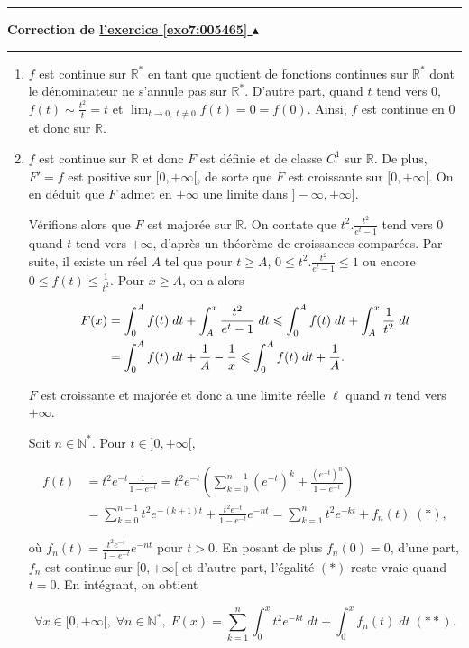 \documentclass[11pt,a4paper]{article}
\newcommand{\Nn}{\mathbb{N}} \newcommand{\N}{\mathbb{N}}
\newcommand{\Rr}{\mathbb{R}} \newcommand{\R}{\mathbb{R}}
\newcounter{exo}
\newcommand{\correction}[1]{\hypertarget{cor7:#1}{}\label{cor7:#1}{\bf Correction de \hyperlink{exo7:#1}{l'exercice \ref{exo7:#1} $\blacktriangle$}}\vspace{1mm}\hrule\vspace{1mm}}
\newcommand{\fincorrection}{\vspace{1mm}\hrule\vspace*{7mm}}
\begin{document}
\fincorrection
\correction{005465}
\begin{enumerate}
\item  $f$ est continue sur $\Rr^*$ en tant que quotient de fonctions continues sur $\Rr^*$ dont le dénominateur ne s'annule pas sur $\Rr^*$. D'autre part, quand $t$ tend vers $0$, $f(t)\sim\frac{t^2}{t}=t$ et $\lim_{t\rightarrow 0,\;t\neq0}f(t)=0=f(0)$. Ainsi, $f$ est continue en $0$ et donc sur $\Rr$.

\item  $f$ est continue sur $\Rr$ et donc $F$ est définie et de classe $C^1$ sur $\Rr$. De plus, $F'=f$ est positive sur $[0,+\infty[$, de sorte que $F$ est croissante sur $[0,+\infty[$. On en déduit que $F$ admet en $+\infty$ une limite dans $]-\infty,+\infty]$.

Vérifions alors que $F$ est majorée sur $\Rr$. On contate que $t^2.\frac{t^2}{e^t-1}$ tend vers $0$ quand $t$ tend vers $+\infty$, d'après un théorème de croissances comparées. Par suite, il existe un réel $A$ tel que pour $t\geq A$, 
$0\leq t^2.\frac{t^2}{e^t-1}\leq1$ ou encore $0\leq f(t)\leq\frac{1}{t^2}$. Pour $x\geq A$, on a alors

\begin{align*}\ensuremath
F(x)&=\int_{0}^{A}f(t)\;dt+\int_{A}^{x}\frac{t^2}{e^t-1}\;dt\leq\int_{0}^{A}f(t)\;dt+\int_{A}^{x}\frac{1}{t^2}\;dt\\
 &=\int_{0}^{A}f(t)\;dt+\frac{1}{A}-\frac{1}{x}\leq\int_{0}^{A}f(t)\;dt+\frac{1}{A}.
\end{align*}

$F$ est croissante et majorée et donc a une limite réelle $\ell$ quand $n$ tend vers $+\infty$.

Soit $n\in\Nn^*$. Pour $t\in]0,+\infty[$,

\begin{align*}
f(t)&=t^2e^{-t}\frac{1}{1-e^{-t}}=t^2e^{-t}(\sum_{k=0}^{n-1}(e^{-t})^k+\frac{(e^{-t})^{n}}{1-e^{-t}})\\
 &=\sum_{k=0}^{n-1}t^2e^{-(k+1)t}+\frac{t^2e^{-t}}{1-e^{-t}}e^{-nt}=\sum_{k=1}^{n}t^2e^{-kt}+f_n(t)\;(*),
\end{align*}

où $f_n(t)=\frac{t^2e^{-t}}{1-e^{-t}}e^{-nt}$ pour $t>0$. En posant de plus $f_n(0)=0$, d'une part, $f_n$ est continue sur $[0,+\infty[$ et d'autre part, l'égalité $(*)$ reste vraie quand $t=0$. En intégrant, on obtient

$$\forall x\in[0,+\infty[,\;\forall n\in\Nn^*,\;F(x)=\sum_{k=1}^{n}\int_{0}^{x}t^2e^{-kt}\;dt+\int_{0}^{x}f_n(t)\;dt\;(**).$$


\end{enumerate}
\end{document}
